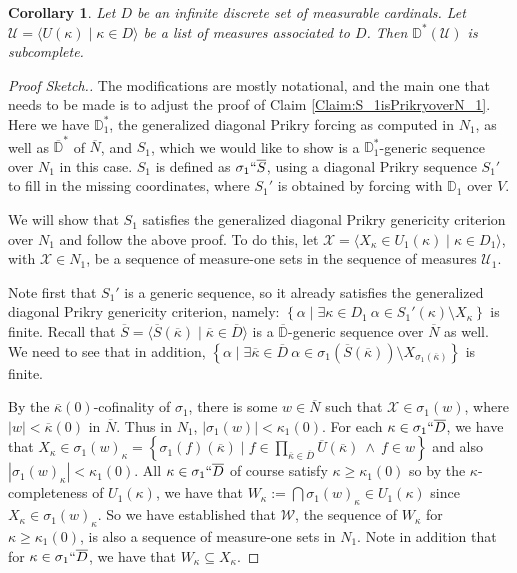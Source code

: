 \documentclass{amsart}
\newtheorem{corollary}[theorem]{Corollary}
\theoremstyle{definition}
\theoremstyle{remark}
\newcommand{\D}{\mathbb{D}}
\newcommand{\N}{{\overline{N}}}
\renewcommand{\S}{{\overline{S}}}
\newcommand{\U}{\mathcal{U}}
\newcommand{\st}{\; | \;}
\newcommand{\set}[2]{\left\{#1\st #2 \right\}}
\newcommand{\seq}[2]{\langle #1 \st #2 \rangle}
\begin{document}
\begin{corollary} 
Let $D$ be an infinite discrete set of measurable cardinals. Let $\U = \seq{ U(\kappa) }{ \kappa \in D }$ be a list of measures associated to $D$. Then $\D^*(\U)$ is subcomplete.
\end{corollary}
\begin{proof}[Proof Sketch.]
The modifications are mostly notational, and the main one that needs to be made is to adjust the proof of Claim \ref{Claim:S_1isPrikryoverN_1}. Here we have $\D^*_1$, the generalized diagonal Prikry forcing as computed in $N_1$, as well as $\overline{\D}^*$ of $\N$, 
and $S_1$, which we would like to show is a $\D_1^*$-generic sequence over $N_1$ in this case. $S_1$ is defined as $\sigma_1 ``\overline S$, using a diagonal Prikry sequence $S_1'$ to fill in the missing coordinates, where $S_1'$ is obtained by forcing with $\D_1$ over $V$.

We will show that $S_1$ satisfies the generalized diagonal Prikry genericity criterion over $N_1$ and follow the above proof. To do this, let $\mathcal X = \seq{ X_\kappa \in U_1(\kappa) }{ \kappa \in D_1 }$, with $\mathcal X \in N_1$, be a sequence of measure-one sets in the sequence of measures $\U_1$.

Note first that $S_1'$ is a generic sequence, so it already satisfies the generalized diagonal Prikry genericity criterion, namely:
$\set{ \alpha }{ \exists \kappa \in D_1 \ \alpha \in S_1'(\kappa) \setminus X_\kappa }$ is finite.
Recall that $\S = \seq{ \S(\overline \kappa) }{ \overline \kappa \in \overline D }$ is a $\overline{\D}$-generic sequence over $\N$ as well.
We need to see that in addition, $\set{ \alpha }{ \exists \overline \kappa \in \overline D \ \alpha \in \sigma_1(\S(\overline \kappa)) \setminus X_{\sigma_1(\overline \kappa)} }$ is finite.

By the $\overline{\kappa}(0)$-cofinality of $\sigma_1$, there is some $w \in \N$ such that $\mathcal X \in \sigma_1(w)$, where $|w| < \overline{\kappa}(0)$ in $\N$. Thus in $N_1$, $|\sigma_1(w)| < \kappa_1(0)$. 
For each $\kappa \in \sigma_1``\overline D$, we have that $X_\kappa \in \sigma_1(w)_\kappa = \set{\sigma_1(f)(\overline \kappa) }{ f \in \prod_{\overline \kappa \in \overline D} \overline U(\overline \kappa) \ \land \ f \in w }$ and also $|\sigma_1(w)_\kappa|<\kappa_1(0).$ All $\kappa \in \sigma_1``\overline D$ of course satisfy $\kappa \geq \kappa_1(0)$ so by the $\kappa$-completeness of $U_1(\kappa)$, we have that $W_\kappa := \bigcap \sigma_1(w)_\kappa \in U_1(\kappa)$ since $X_\kappa \in \sigma_1(w)_\kappa$.
So we have established that $\mathcal W$, the sequence of $W_\kappa$ for $\kappa \geq \kappa_1(0)$, is also a sequence of measure-one sets in $N_1$. Note in addition that for $\kappa \in \sigma_1``\overline D$, we have that $W_\kappa \subseteq X_\kappa$. 


\end{proof}
\end{document}
